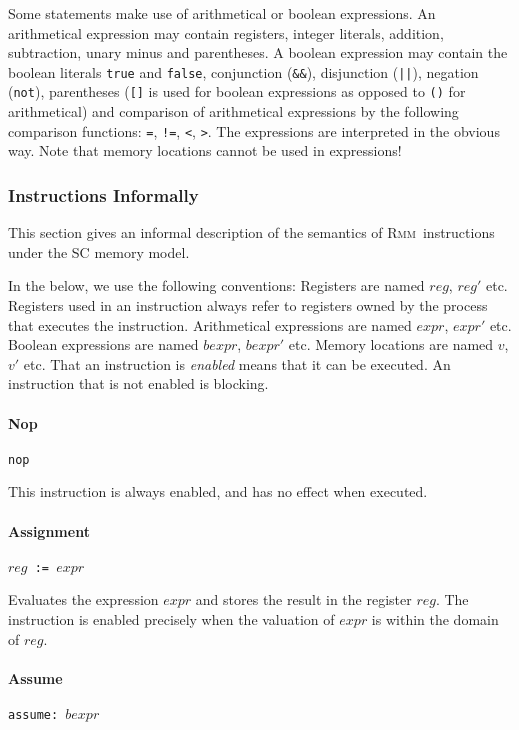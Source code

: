 \documentclass[a4paper]{article}
\newcommand{\rmm}{\textsc{Rmm}}
\begin{document}
Some statements make use of arithmetical or boolean expressions. An
arithmetical expression may contain registers, integer literals,
addition, subtraction, unary minus and parentheses. A boolean
expression may contain the boolean literals \verb+true+ and
\verb+false+, conjunction (\verb+&&+), disjunction (\verb+||+),
negation (\verb+not+), parentheses (\verb+[]+ is used for boolean
expressions as opposed to \verb+()+ for arithmetical) and comparison
of arithmetical expressions by the following comparison functions:
\verb+=+, \verb+!=+, \verb+<+, \verb+>+. The
expressions are interpreted in the obvious way. Note that memory
locations cannot be used in expressions!

\subsubsection{Instructions Informally}

This section gives an informal description of the semantics of \rmm\
instructions under the SC memory model.

In the below, we use the following conventions: Registers are named
$reg$, $reg'$ etc. Registers used in an instruction always refer to
registers owned by the process that executes the
instruction. Arithmetical expressions are named $expr$, $expr'$
etc. Boolean expressions are named $bexpr$, $bexpr'$ etc. Memory
locations are named $v$, $v'$ etc. That an instruction is
\emph{enabled} means that it can be executed. An instruction that is
not enabled is blocking.

\paragraph{Nop} \verb+nop+

This instruction is always enabled, and has no effect when executed.

\paragraph{Assignment} $reg$\verb+ := +$expr$

Evaluates the expression $expr$ and stores the result in the register
$reg$. The instruction is enabled precisely when the valuation of
$expr$ is within the domain of $reg$.

\paragraph{Assume} \verb+assume: +$bexpr$
\end{document}
